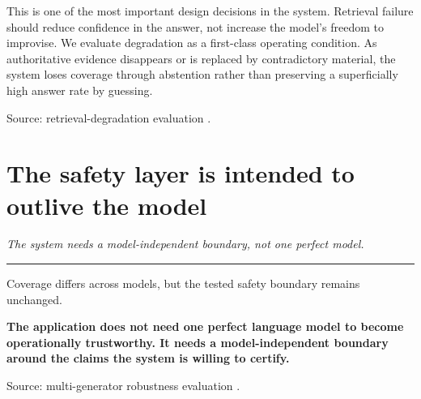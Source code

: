\documentclass[11pt,a4paper]{article}
\newcommand{\MEASURED}{\badgeM{MEASURED}}
\newcommand{\takeaway}[1]{{\color{kcgrey}\itshape\large #1}\par\vspace{2pt}%
  {\color{kcline}\rule{\linewidth}{0.8pt}}\par\vspace{6pt}}
\newcommand{\srcfoot}[1]{\par\vspace{4pt}{\color{kcline}\rule{\linewidth}{0.4pt}}\par
  {\footnotesize\color{kcgrey}#1}\par}
\begin{document}
This is one of the most important design decisions in the system. Retrieval
failure should reduce confidence in the answer, not increase the model's freedom
to improvise. We evaluate degradation as a first-class operating condition. As
authoritative evidence disappears or is replaced by contradictory material, the
system loses coverage through abstention rather than preserving a superficially
high answer rate by guessing.

\srcfoot{Source: retrieval-degradation evaluation \MEASURED{} \cite{cea_manuscript}.}

\newpage
\section*{\color{kcgreen}The safety layer is intended to outlive the model}
\takeaway{The system needs a model-independent boundary, not one perfect model.}

\begin{center}
\end{center}

Coverage differs across models, but the tested safety boundary remains unchanged.

\begin{pullquote}
{\bfseries\color{kcgreen}The application does not need one perfect language model to become operationally trustworthy. It needs a model-independent boundary around the claims the system is willing to certify.}
\end{pullquote}

\srcfoot{Source: multi-generator robustness evaluation \MEASURED{} \cite{cea_manuscript}.}
\end{document}
